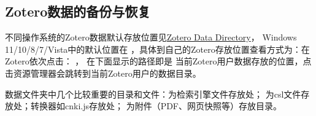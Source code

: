 \documentclass[theorem=false,mathfont=none,openany,sub3section]{easybook}
\begin{document}
\subsection{Zotero数据的备份与恢复} \label{sec:data_dir}
不同操作系统的Zotero数据默认存放位置见\href{https://www.zotero.org/support/zotero_data}{Zotero Data Directory}，
Windows 11/10/8/7/Vista中的默认位置在
，具体到自己的Zotero存放位置查看方式为：在Zotero依次点击：
，
在下面显示的路径即是
当前Zotero用户数据存放的位置，点击资源管理器会跳转到当前Zotero用户的数据目录。

数据文件夹中几个比较重要的目录和文件：为检索引擎文件存放处；
为csl文件存放处；转换器如cnki.js存放处；
为附件（PDF、网页快照等）存放目录。
\end{document}
